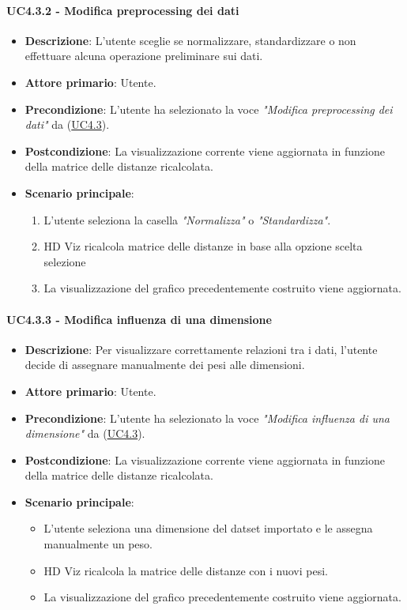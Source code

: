 \paragraph{UC4.3.2 - Modifica preprocessing dei dati}
\label{par:uc4.3.2}
\begin{itemize}
    \item \textbf{Descrizione}: L’utente sceglie se normalizzare, standardizzare o non effettuare alcuna operazione preliminare sui dati.

    \item \textbf{Attore primario}: Utente.
    \item \textbf{Precondizione}: L'utente ha selezionato la voce \emph{"Modifica preprocessing dei dati"} da (\hyperref[ssub:uc4.3]{UC4.3}).
    \item \textbf{Postcondizione}: La visualizzazione corrente viene aggiornata in funzione della matrice delle distanze ricalcolata.
    \item \textbf{Scenario principale}:
    \begin{enumerate}
        \item L'utente seleziona la casella \emph{"Normalizza"} o \emph{"Standardizza"}.
        \item HD Viz ricalcola matrice delle distanze in base alla opzione scelta selezione
        \item La visualizzazione del grafico precedentemente costruito viene aggiornata.
    \end{enumerate}
\end{itemize}

\paragraph{UC4.3.3 - Modifica influenza di una dimensione}
\label{par:uc4.3.3}
\begin{itemize}
    \item \textbf{Descrizione}: Per visualizzare correttamente relazioni tra i dati,
                                l’utente decide di assegnare manualmente dei pesi alle dimensioni.

    \item \textbf{Attore primario}: Utente.
    \item \textbf{Precondizione}: L'utente ha selezionato la voce \emph{"Modifica influenza di una dimensione"} da (\hyperref[ssub:uc4.3]{UC4.3}).

    \item \textbf{Postcondizione}: La visualizzazione corrente viene aggiornata in funzione della matrice delle distanze ricalcolata.
    \item \textbf{Scenario principale}:
    \begin{itemize}
        \item L’utente seleziona una dimensione del datset importato e le assegna manualmente un peso.
        \item HD Viz ricalcola la matrice delle distanze con i nuovi pesi.
        \item La visualizzazione del grafico precedentemente costruito viene aggiornata.
    \end{itemize}
\end{itemize}

